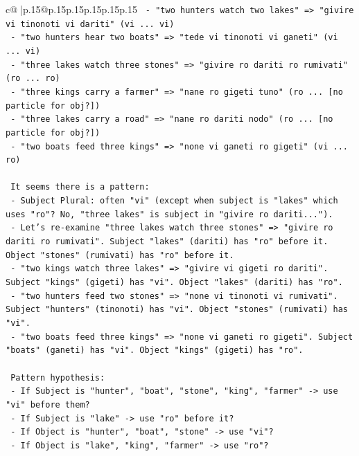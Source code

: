 \documentclass{article}
\begin{document}
{\begin{supertabular}{c@{$\;$}|p{.15\linewidth}@{}p{.15\linewidth}p{.15\linewidth}p{.15\linewidth}p{.15\linewidth}p{.15\linewidth}}
{{{\texttt{    {-} "two hunters watch two lakes" => "givire vi tinonoti vi dariti" (vi ... vi)} \\
\texttt{    {-} "two hunters hear two boats" => "tede vi tinonoti vi ganeti" (vi ... vi)} \\
\texttt{    {-} "three lakes watch three stones" => "givire ro dariti ro rumivati" (ro ... ro)} \\
\texttt{    {-} "three kings carry a farmer" => "nane ro gigeti tuno" (ro ... {[}no particle for obj?{]})} \\
\texttt{    {-} "three lakes carry a road" => "nane ro dariti nodo" (ro ... {[}no particle for obj?{]})} \\
\texttt{    {-} "two boats feed three kings" => "none vi ganeti ro gigeti" (vi ... ro)} \\
\\ 
\texttt{    It seems there is a pattern:} \\
\texttt{    {-} Subject Plural: often "vi" (except when subject is "lakes" which uses "ro"? No, "three lakes" is subject in "givire ro dariti...").} \\
\texttt{    {-} Let's re{-}examine "three lakes watch three stones" => "givire ro dariti ro rumivati". Subject "lakes" (dariti) has "ro" before it. Object "stones" (rumivati) has "ro" before it.} \\
\texttt{    {-} "two kings watch three lakes" => "givire vi gigeti ro dariti". Subject "kings" (gigeti) has "vi". Object "lakes" (dariti) has "ro".} \\
\texttt{    {-} "two hunters feed two stones" => "none vi tinonoti vi rumivati". Subject "hunters" (tinonoti) has "vi". Object "stones" (rumivati) has "vi".} \\
\texttt{    {-} "two boats feed three kings" => "none vi ganeti ro gigeti". Subject "boats" (ganeti) has "vi". Object "kings" (gigeti) has "ro".} \\
\\ 
\texttt{    Pattern hypothesis:} \\
\texttt{    {-} If Subject is "hunter", "boat", "stone", "king", "farmer" {-}> use "vi" before them?} \\
\texttt{    {-} If Subject is "lake" {-}> use "ro" before it?} \\
\texttt{    {-} If Object is "hunter", "boat", "stone" {-}> use "vi"?} \\
\texttt{    {-} If Object is "lake", "king", "farmer" {-}> use "ro"?} \\
\\ 
}}}
\end{supertabular}}
\end{document}
